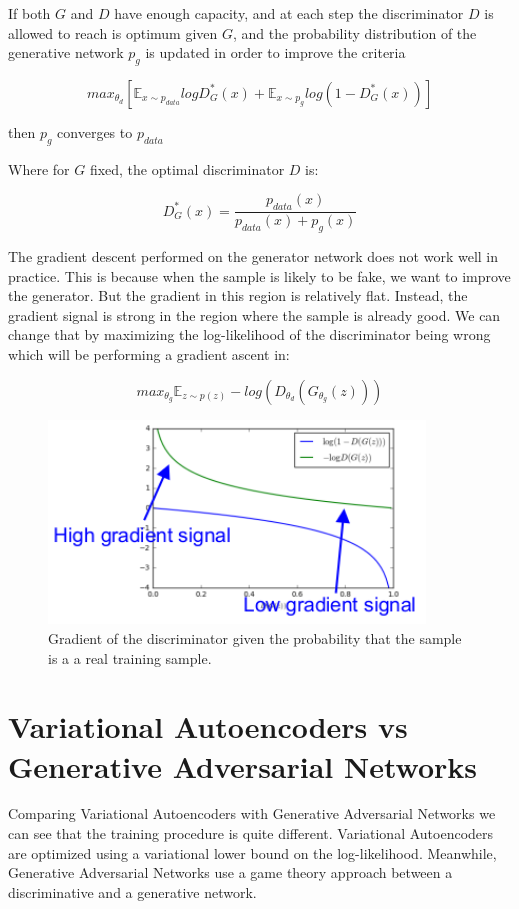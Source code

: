 \noindent If both $G$ and $D$ have enough capacity, and at each step the discriminator $D$ is allowed to reach is optimum given $G$, and the probability distribution of the generative network $p_g$ is updated in order to improve the criteria

$$ max_{\theta_d} \left[ \mathbb{E}_{x \sim p_{data}} log D_{G}^{*} (x) + \mathbb{E}_{x \sim p_g} log \left( 1 - D_{G}^{*} (x)     \right)    \right] $$

then $p_g$ converges to $p_{data}$

\noindent Where for $G$ fixed, the optimal discriminator $D$ is:

$$ D_G^* (x) = \frac{p_{data} (x)}{p_{data} (x) + p_g (x)} $$

\noindent The gradient descent performed on the generator network does not work well in practice. This is because when the sample is likely to be fake, we want to improve the generator. But the gradient in this region is relatively flat. Instead, the gradient signal is strong in the region where the sample is already good. We can change that by maximizing the log-likelihood of the discriminator being wrong which will be performing a gradient ascent in:

$$ max_{\theta_g} \mathbb{E}_{z \sim p(z)} -log \left( D_{\theta_d} \left( G_{\theta_g} (z)  \right)     \right) $$

\begin{figure}[h]
    \centering
    \includegraphics[width=10cm]{Plots/gan-gradient.png}
    \caption{Gradient of the discriminator given the probability that the sample is a a real training sample.}
\end{figure}

\section{Variational Autoencoders vs Generative Adversarial Networks}

Comparing Variational Autoencoders with Generative Adversarial Networks we can see that the training procedure is quite different. Variational Autoencoders are optimized using a variational lower bound on the log-likelihood. Meanwhile, Generative Adversarial Networks use a game theory approach between a discriminative and a generative network.

